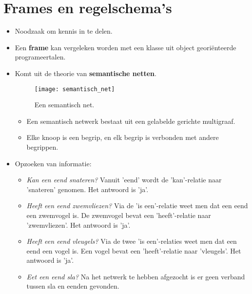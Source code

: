 \section{Frames en regelschema's}
\begin{itemize}
	\item Noodzaak om kennis in te delen.
	\item Een \textbf{frame} kan vergeleken worden met een klasse uit object georiënteerde programeertalen.
	\item Komt uit de theorie van \textbf{semantische netten}.
	\begin{figure}[ht]
		\texttt{[image: semantisch\_net]}
		\caption{Een semantisch net.}
	\end{figure}
	\begin{itemize}
		\item Een semantisch netwerk bestaat uit een gelabelde gerichte multigraaf.
		\item Elke knoop is een begrip, en elk begrip is verbonden met andere begrippen.
	\end{itemize}
	\item Opzoeken van informatie:
	\begin{itemize}
		\item \textit{Kan een eend snateren?} Vanuit 'eend' wordt de 'kan'-relatie naar 'snateren' genomen. Het antwoord is 'ja'.
		\item \textit{Heeft een eend zwemvliezen?} Via de 'is een'-relatie weet men dat een eend een zwemvogel is. De zwemvogel bevat een 'heeft'-relatie naar 'zwemvliezen'. Het antwoord is 'ja'.
		\item \textit{Heeft een eend vleugels?} Via de twee 'is een'-relaties weet men dat een eend een vogel is. Een vogel bevat een 'heeft'-relatie naar 'vleugels'. Het antwoord is 'ja'.
		\item \textit{Eet een eend sla?} Na het netwerk te hebben afgezocht is er geen verband tussen sla en eenden gevonden.
		

\end{itemize}
\end{itemize}
